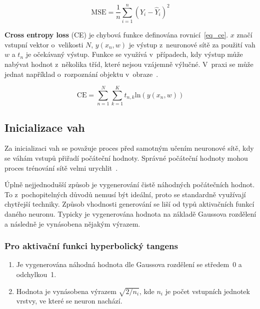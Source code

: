 \begin{equation}
    \mathrm{MSE}=\frac{1}{n} \sum_{i = 1}^{n} (Y_i - \hat{Y}_i)^2
    \label{eq_mse}
\end{equation}

\textbf{Cross entropy loss} (CE) je chybová funkce definována rovnicí~\ref{eq_ce}. $x$ značí vstupní vektor o~velikosti $N$, $y(x_n, w)$ je výstup z~neuronové sítě za použití vah $w$ a $t_n$ je očekávaný výstup. Funkce se využívá v~případech, kdy výstup může nabývat hodnot z~několika tříd, které nejsou vzájemně výlučné. V~praxi se může jednat například o~rozpoznání objektu v~obraze~\cite{articleCe}.

\begin{equation}
    \mathrm{CE}=\sum_{n = 1}^{N} \sum_{k = 1}^{K} t_{n,k}\mathrm{ln}(y(x_n, w))
    \label{eq_ce}
\end{equation}


\subsection*{Inicializace vah}

Za inicializaci vah se považuje proces před samotným učením neuronové sítě, kdy se váhám vstupů přiřadí počáteční hodnoty. Správné počáteční hodnoty mohou proces trénování sítě velmi urychlit~\cite{hackernoonXavier}.

Úplně nejjednodušší způsob je vygenerování čistě náhodných počátečních hodnot. To z~pochopitelných důvodů nemusí být ideální, proto se standardně využívají chytřejší techniky. Způsob vhodnosti generování se liší od typů aktivačních funkcí daného neuronu. Typicky je vygenerována hodnota na základě Gaussova rozdělení a následně je vynásobena nějakým výrazem.

\subsubsection*{Pro aktivační funkci hyperbolický tangens}
\begin{enumerate}
    \item Je vygenerována náhodná hodnota dle Gaussova rozdělení se středem~0 a odchylkou~1.
    \item Hodnota je vynásobena výrazem $\sqrt{2/n_i}$, kde $n_i$ je počet vstupních jednotek vrstvy, ve které se neuron nachází.
\end{enumerate}

